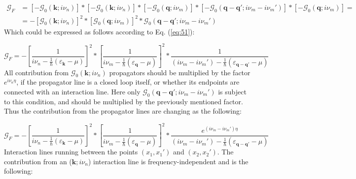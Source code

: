 \begin{align} \label{eq:52}
\mathcal{G}_{F}
&=
\left[ - \mathcal{G}_{0} \left( \boldsymbol{k}; i \nu_{n} \right) \right]
*
\left[ - \mathcal{G}_{0} \left( \boldsymbol{k}; i \nu_{n} \right) \right]
*
\left[ - \mathcal{G}_{0} \left( \boldsymbol{q}; i \nu_{m} \right) \right]
*
\left[ - \mathcal{G}_{0} \left( \boldsymbol{q} - \boldsymbol{q}'; i \nu_{m} - i \nu_{m}' \right) \right]
*
\left[ - \mathcal{G}_{0} \left( \boldsymbol{q}; i \nu_{m} \right) \right]
= \nonumber \\
&=
- \left[ \mathcal{G}_{0} \left( \boldsymbol{k}; i \nu_{n} \right) \right]^{2}
*
\left[ \mathcal{G}_{0} \left( \boldsymbol{q}; i \nu_{m} \right) \right]^{2}
*
\mathcal{G}_{0} \left( \boldsymbol{q} - \boldsymbol{q}'; i \nu_{m} - i \nu_{m}' \right)
\end{align}
Which could be expressed as follows according to Eq. (\ref{eq:51}):

\begin{equation}  \label{eq:53}
\mathcal{G}_{F}
=
- \left[
\frac{1}{i \nu_{n} - \frac{1}{\hbar} \left( \varepsilon_{\boldsymbol{k}} - \mu \right)}
\right]^{2}
*
\left[
\frac{1}{i \nu_{m} - \frac{1}{\hbar} \left( \varepsilon_{\boldsymbol{q}} - \mu \right)}
\right]^{2}
*
\frac{1}{\left( i \nu_{m} - i \nu_{m}' \right) - \frac{1}{\hbar} \left( \varepsilon_{\boldsymbol{q} - \boldsymbol{q}'} - \mu \right)}
\end{equation}
All contribution from $\mathcal{G}_{0} \left( \boldsymbol{k}; i \nu_{n} \right)$ propagators should be multiplied by the factor $e^{i \nu_{n} \eta}$, if the propagator line is a closed loop itself, or whether its endpoints are connected with an interaction line. Here only $\mathcal{G}_{0} \left( \boldsymbol{q} - \boldsymbol{q}'; i \nu_{m} - i \nu_{m}' \right)$ is subject to this condition, and should be multiplied by the previously mentioned factor. Thus the contribution from the propagator lines are changing as the following:

\begin{equation} \label{eq:54}
\mathcal{G}_{F}
=
- \left[
\frac{1}{i \nu_{n} - \frac{1}{\hbar} \left( \varepsilon_{\boldsymbol{k}} - \mu \right)}
\right]^{2}
*
\left[
\frac{1}{i \nu_{m} - \frac{1}{\hbar} \left( \varepsilon_{\boldsymbol{q}} - \mu \right)}
\right]^{2}
*
\frac{e^{\left( i \nu_{m} - i \nu_{m}' \right) \eta}}{\left( i \nu_{m} - i \nu_{m}' \right) - \frac{1}{\hbar} \left( \varepsilon_{\boldsymbol{q} - \boldsymbol{q}'} - \mu \right)}
\end{equation}
Interaction lines running between the points $\left( x_{1}, x_{1}' \right)$ and $\left( x_{2}, x_{2}' \right)$. The contribution from an ($\boldsymbol{k}; i \nu_{n}$) interaction line is frequency-independent and is the following:

